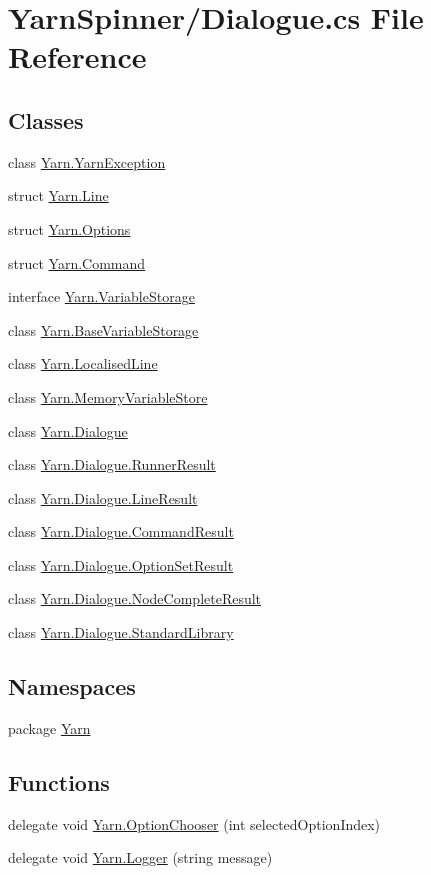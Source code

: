 \hypertarget{a00262}{\section{Yarn\-Spinner/\-Dialogue.cs File Reference}
\label{a00262}
}
\subsection*{Classes}
\begin{DoxyCompactItemize}
\item 
class \hyperlink{a00168}{Yarn.\-Yarn\-Exception}
\item 
struct \hyperlink{a00029_d4/d6f/a00315}{Yarn.\-Line}
\item 
struct \hyperlink{a00029_d2/d41/a00318}{Yarn.\-Options}
\item 
struct \hyperlink{a00029_d7/df2/a00312}{Yarn.\-Command}
\item 
interface \hyperlink{a00164}{Yarn.\-Variable\-Storage}
\item 
class \hyperlink{a00021}{Yarn.\-Base\-Variable\-Storage}
\item 
class \hyperlink{a00106}{Yarn.\-Localised\-Line}
\item 
class \hyperlink{a00108}{Yarn.\-Memory\-Variable\-Store}
\item 
class \hyperlink{a00070}{Yarn.\-Dialogue}
\item 
class \hyperlink{a00130}{Yarn.\-Dialogue.\-Runner\-Result}
\item 
class \hyperlink{a00104}{Yarn.\-Dialogue.\-Line\-Result}
\item 
class \hyperlink{a00030}{Yarn.\-Dialogue.\-Command\-Result}
\item 
class \hyperlink{a00117}{Yarn.\-Dialogue.\-Option\-Set\-Result}
\item 
class \hyperlink{a00111}{Yarn.\-Dialogue.\-Node\-Complete\-Result}
\item 
class \hyperlink{a00138}{Yarn.\-Dialogue.\-Standard\-Library}
\end{DoxyCompactItemize}
\subsection*{Namespaces}
\begin{DoxyCompactItemize}
\item 
package \hyperlink{a00029}{Yarn}
\end{DoxyCompactItemize}
\subsection*{Functions}
\begin{DoxyCompactItemize}
\item 
delegate void \hyperlink{a00029_a39866cbb03c03a35805d598b5d4ad553}{Yarn.\-Option\-Chooser} (int selected\-Option\-Index)
\item 
delegate void \hyperlink{a00029_a1e50031b945a3a2afafee6f590730568}{Yarn.\-Logger} (string message)
\end{DoxyCompactItemize}


